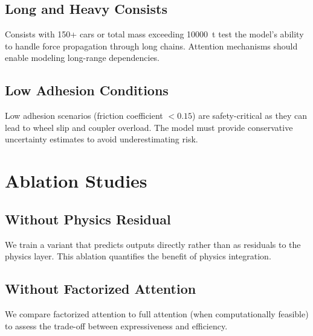 
\subsection{Long and Heavy Consists}

Consists with 150+ cars or total mass exceeding \SI{10000}{\tonne} test the model's ability to handle force propagation through long chains. Attention mechanisms should enable modeling long-range dependencies.


\subsection{Low Adhesion Conditions}

Low adhesion scenarios (friction coefficient $< 0.15$) are safety-critical as they can lead to wheel slip and coupler overload. The model must provide conservative uncertainty estimates to avoid underestimating risk.


\section{Ablation Studies}

\subsection{Without Physics Residual}

We train a variant that predicts outputs directly rather than as residuals to the physics layer. This ablation quantifies the benefit of physics integration.


\subsection{Without Factorized Attention}

We compare factorized attention to full attention (when computationally feasible) to assess the trade-off between expressiveness and efficiency.

